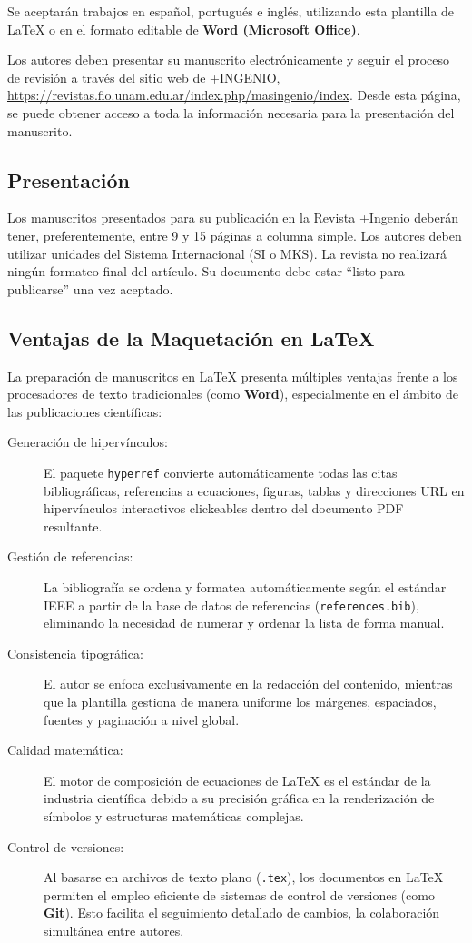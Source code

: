 \documentclass[a4paper, 12pt]{article}
\begin{document}
Se aceptarán trabajos en español, portugués e inglés, utilizando esta plantilla de \LaTeX{} o en el formato editable de \textbf{Word (Microsoft Office)}.

Los autores deben presentar su manuscrito electrónicamente y seguir el proceso
de revisión a través del sitio web de +INGENIO,
\url{https://revistas.fio.unam.edu.ar/index.php/masingenio/index}. Desde esta
página, se puede obtener acceso a toda la información necesaria para la
presentación del manuscrito.

\subsection{Presentación}

Los manuscritos presentados para su publicación en la Revista +Ingenio deberán
tener, preferentemente, entre 9 y 15 páginas a columna simple. Los autores deben
utilizar unidades del Sistema Internacional (SI o MKS). La revista no realizará
ningún formateo final del artículo. Su documento debe estar “listo para
publicarse” una vez aceptado.

\subsection{Ventajas de la Maquetación en \LaTeX{}}

La preparación de manuscritos en \LaTeX{} presenta múltiples ventajas frente a los procesadores de texto tradicionales (como \textbf{Word}), especialmente en el ámbito de las publicaciones científicas:
\begin{description}
  \item[Generación de hipervínculos:] El paquete \texttt{hyperref} convierte automáticamente todas las citas bibliográficas, referencias a ecuaciones, figuras, tablas y direcciones URL en hipervínculos interactivos clickeables dentro del documento PDF resultante.
  \item[Gestión de referencias:] La bibliografía se ordena y formatea automáticamente según el estándar IEEE a partir de la base de datos de referencias (\texttt{references.bib}), eliminando la necesidad de numerar y ordenar la lista de forma manual.
  \item[Consistencia tipográfica:] El autor se enfoca exclusivamente en la redacción del contenido, mientras que la plantilla gestiona de manera uniforme los márgenes, espaciados, fuentes y paginación a nivel global.
  \item[Calidad matemática:] El motor de composición de ecuaciones de \LaTeX{} es el estándar de la industria científica debido a su precisión gráfica en la renderización de símbolos y estructuras matemáticas complejas.
  \item[Control de versiones:] Al basarse en archivos de texto plano (\texttt{.tex}), los documentos en \LaTeX{} permiten el empleo eficiente de sistemas de control de versiones (como \textbf{Git}). Esto facilita el seguimiento detallado de cambios, la colaboración simultánea entre autores.
\end{description}
\end{document}
